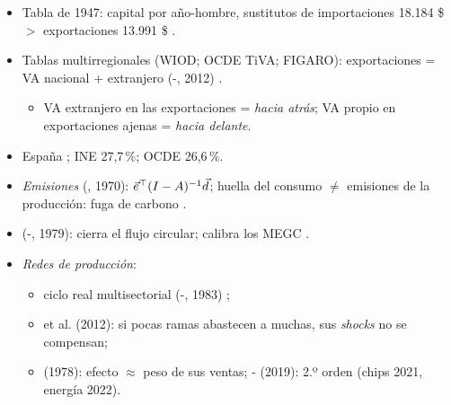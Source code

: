 \documentclass{article}
\begin{document}
\begin{columnas}
\begin{itemize}
\item Tabla de 1947: capital por año-hombre, sustitutos de importaciones 18.184 \$ $>$ exportaciones 13.991 \$ .
\end{itemize}
\begin{itemize}
\item Tablas multirregionales (WIOD; OCDE TiVA; FIGARO): exportaciones = VA nacional + extranjero (-, 2012) .
  \begin{itemize}
  \item VA extranjero en las exportaciones = \emph{hacia atrás}; VA propio en exportaciones ajenas = \emph{hacia delante}.
  \end{itemize}
\end{itemize}
\begin{itemize}
\item España  ; INE 27,7\,\%; OCDE 26,6\,\%.
\end{itemize}
\begin{itemize}
\item \emph{Emisiones} (, 1970): $\vec{e}^{\top}(I-A)^{-1}\vec{d}$; huella del consumo $\neq$ emisiones de la producción: fuga de carbono .
\item {} (-, 1979): cierra el flujo circular; calibra los MEGC .
\item \emph{Redes de producción}:
  \begin{itemize}
  \item ciclo real multisectorial (-, 1983) ;
  \item {} et al. (2012): si pocas ramas abastecen a muchas, sus \emph{shocks} no se compensan;
  \item {} (1978): efecto $\approx$ peso de sus ventas; - (2019): 2.º orden (chips 2021, energía 2022).
  \end{itemize}
\end{itemize}


\end{columnas}
\end{document}
